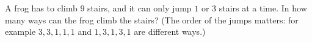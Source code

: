 A frog has to climb $9$ stairs, and it can only jump $1$ or $3$ stairs at a time. In how many ways can the frog climb the stairs? (The order of the jumps matters: for example $3,3,1,1,1$ and $1,3,1,3,1$ are different ways.)
